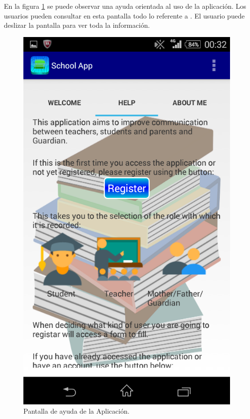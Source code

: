 			En la figura \ref{fig:help} se puede observar una ayuda orientada al uso de la aplicación. Los usuarios pueden consultar en esta pantalla todo lo referente a \CollegeApp. El usuario puede deslizar la pantalla para ver toda la información.
			
			\begin{figure}[h !]
				\centering
				\includegraphics[scale=0.2]{Imagenes/App/help}
				\caption{Pantalla de ayuda de la Aplicación.}
				\label{fig:help}
			\end{figure}
		
